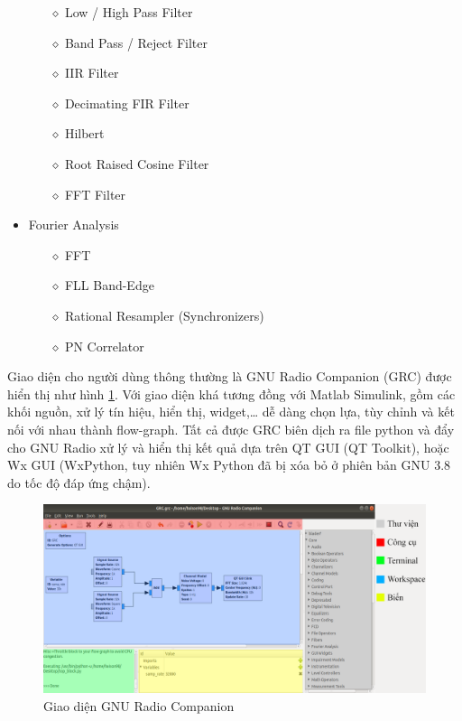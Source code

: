 \begin{itemize}
	\begin{itemize}
		\item[$\diamond$] Low / High Pass Filter
		\item[$\diamond$] Band Pass / Reject Filter
		\item[$\diamond$] IIR Filter
		\item[$\diamond$] Decimating FIR Filter
		\item[$\diamond$] Hilbert
		\item[$\diamond$] Root Raised Cosine Filter
		\item[$\diamond$] FFT Filter
	\end{itemize}
\item Fourier Analysis 
	\begin{itemize}
		\item[$\diamond$] FFT
		\item[$\diamond$] FLL Band-Edge
		\item[$\diamond$] Rational Resampler (Synchronizers)
		\item[$\diamond$] PN Correlator
	\end{itemize}
\end{itemize}

Giao diện cho người dùng thông thường là GNU Radio Companion (GRC) được hiển thị như hình \ref{fig:GNURadio}. Với giao diện khá tương đồng với Matlab Simulink, gồm các khối nguồn, xử lý tín hiệu, hiển thị, widget,… dễ dàng chọn lựa, tùy chỉnh và kết nối với nhau thành flow-graph. Tất cả được GRC biên dịch ra file python và đẩy cho GNU Radio xử lý và hiển thị kết quả dựa trên QT GUI (QT Toolkit), hoặc Wx GUI (WxPython, tuy nhiên Wx Python đã bị xóa bỏ ở phiên bản GNU 3.8 do tốc độ đáp ứng chậm).

\begin{figure} [!h]
	\centering
	\includegraphics[width=1\linewidth]{figures/GNURadio1.png}
	\caption{Giao diện GNU Radio Companion}
	\label{fig:GNURadio}
\end{figure}

